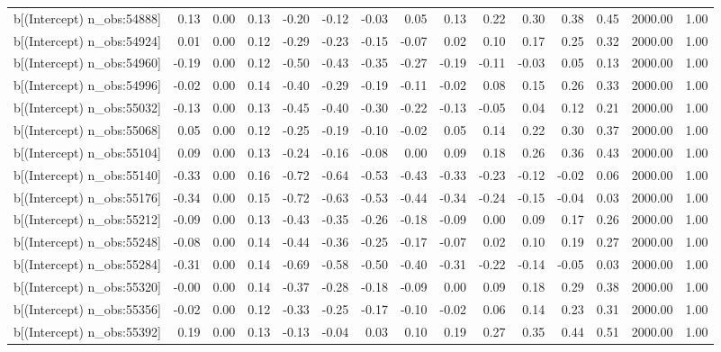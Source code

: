 \begin{table}[ht]
\begin{tabular}{rrrrrrrrrrrrrrr}
  b[(Intercept) n\_obs:54888] & 0.13 & 0.00 & 0.13 & -0.20 & -0.12 & -0.03 & 0.05 & 0.13 & 0.22 & 0.30 & 0.38 & 0.45 & 2000.00 & 1.00 \\ 
  b[(Intercept) n\_obs:54924] & 0.01 & 0.00 & 0.12 & -0.29 & -0.23 & -0.15 & -0.07 & 0.02 & 0.10 & 0.17 & 0.25 & 0.32 & 2000.00 & 1.00 \\ 
  b[(Intercept) n\_obs:54960] & -0.19 & 0.00 & 0.12 & -0.50 & -0.43 & -0.35 & -0.27 & -0.19 & -0.11 & -0.03 & 0.05 & 0.13 & 2000.00 & 1.00 \\ 
  b[(Intercept) n\_obs:54996] & -0.02 & 0.00 & 0.14 & -0.40 & -0.29 & -0.19 & -0.11 & -0.02 & 0.08 & 0.15 & 0.26 & 0.33 & 2000.00 & 1.00 \\ 
  b[(Intercept) n\_obs:55032] & -0.13 & 0.00 & 0.13 & -0.45 & -0.40 & -0.30 & -0.22 & -0.13 & -0.05 & 0.04 & 0.12 & 0.21 & 2000.00 & 1.00 \\ 
  b[(Intercept) n\_obs:55068] & 0.05 & 0.00 & 0.12 & -0.25 & -0.19 & -0.10 & -0.02 & 0.05 & 0.14 & 0.22 & 0.30 & 0.37 & 2000.00 & 1.00 \\ 
  b[(Intercept) n\_obs:55104] & 0.09 & 0.00 & 0.13 & -0.24 & -0.16 & -0.08 & 0.00 & 0.09 & 0.18 & 0.26 & 0.36 & 0.43 & 2000.00 & 1.00 \\ 
  b[(Intercept) n\_obs:55140] & -0.33 & 0.00 & 0.16 & -0.72 & -0.64 & -0.53 & -0.43 & -0.33 & -0.23 & -0.12 & -0.02 & 0.06 & 2000.00 & 1.00 \\ 
  b[(Intercept) n\_obs:55176] & -0.34 & 0.00 & 0.15 & -0.72 & -0.63 & -0.53 & -0.44 & -0.34 & -0.24 & -0.15 & -0.04 & 0.03 & 2000.00 & 1.00 \\ 
  b[(Intercept) n\_obs:55212] & -0.09 & 0.00 & 0.13 & -0.43 & -0.35 & -0.26 & -0.18 & -0.09 & 0.00 & 0.09 & 0.17 & 0.26 & 2000.00 & 1.00 \\ 
  b[(Intercept) n\_obs:55248] & -0.08 & 0.00 & 0.14 & -0.44 & -0.36 & -0.25 & -0.17 & -0.07 & 0.02 & 0.10 & 0.19 & 0.27 & 2000.00 & 1.00 \\ 
  b[(Intercept) n\_obs:55284] & -0.31 & 0.00 & 0.14 & -0.69 & -0.58 & -0.50 & -0.40 & -0.31 & -0.22 & -0.14 & -0.05 & 0.03 & 2000.00 & 1.00 \\ 
  b[(Intercept) n\_obs:55320] & -0.00 & 0.00 & 0.14 & -0.37 & -0.28 & -0.18 & -0.09 & 0.00 & 0.09 & 0.18 & 0.29 & 0.38 & 2000.00 & 1.00 \\ 
  b[(Intercept) n\_obs:55356] & -0.02 & 0.00 & 0.12 & -0.33 & -0.25 & -0.17 & -0.10 & -0.02 & 0.06 & 0.14 & 0.23 & 0.31 & 2000.00 & 1.00 \\ 
  b[(Intercept) n\_obs:55392] & 0.19 & 0.00 & 0.13 & -0.13 & -0.04 & 0.03 & 0.10 & 0.19 & 0.27 & 0.35 & 0.44 & 0.51 & 2000.00 & 1.00 \\ 

\end{tabular}
\end{table}
